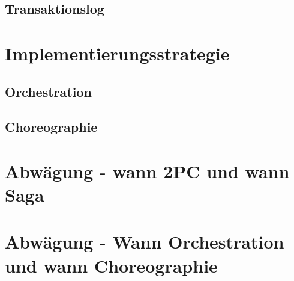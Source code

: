 \subsection{Transaktionslog}



\section{Implementierungsstrategie}

\subsection{Orchestration}

\subsection{Choreographie}

\section{Abwägung - wann 2PC und wann Saga}

\section{Abwägung - Wann Orchestration und wann Choreographie}

